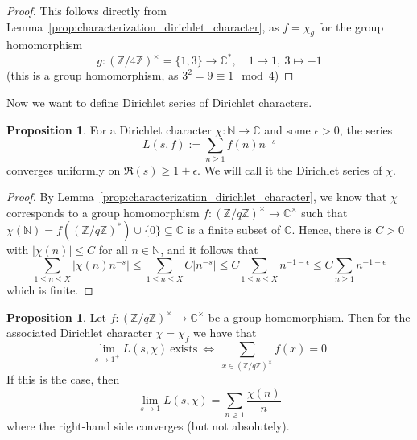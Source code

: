 \documentclass{scrartcl}
\newcommand{\N}{\mathbb{N}}
\newcommand{\Z}{\mathbb{Z}}
\newcommand{\C}{\mathbb{C}}
\newcommand{\units}{\times}
\theoremstyle{definition}
\newtheorem{proposition}[definition]{Proposition}
\begin{document}
\begin{proof}
    This follows directly from Lemma~\ref{prop:characterization_dirichlet_character}, as $f = \chi_g$ for the group homomorphism
    \begin{equation*}
        g: (\Z/4\Z)^\units = \{ 1, 3 \} \to \C^*, \quad 1 \mapsto 1, \ 3 \mapsto -1
    \end{equation*}
    (this is a group homomorphism, as $3^2 = 9 \equiv 1 \mod 4$)
\end{proof}
Now we want to define Dirichlet series of Dirichlet characters.
\begin{proposition}
    For a Dirichlet character $\chi: \N \to \C$ and some $\epsilon > 0$, the series
    \begin{equation*}
        L(s, f) := \sum_{n \geq 1} f(n) n^{-s}
    \end{equation*}
    converges uniformly on $\Re(s) \geq 1 + \epsilon$.
    We will call it the Dirichlet series of $\chi$.
\end{proposition}
\begin{proof}
    By Lemma~\ref{prop:characterization_dirichlet_character}, we know that $\chi$ corresponds to a group homomorphism $f: (\Z/q\Z)^\units \to \C^\units$ such that $\chi(\N) = f((\Z/q\Z)^*) \cup \{ 0 \} \subseteq \C$ is a finite subset of $\C$.
    Hence, there is $C > 0$ with $|\chi(n)| \leq C$ for all $n \in \N$, and it follows that
    \begin{equation*}
        \sum_{1 \leq n \leq X} \left| \chi(n) n^{-s} \right| \leq \sum_{1 \leq n \leq X} C \left| n^{-s} \right| \leq C \sum_{1 \leq n \leq X} n^{-1 - \epsilon} \leq C \sum_{n \geq 1} n^{-1 - \epsilon}
    \end{equation*}
    which is finite.
\end{proof}
\begin{proposition}
    \label{prop:dirichlet_series_at_one}
    Let $f: (\Z/q\Z)^\units \to \C^\units$ be a group homomorphism. Then for the associated Dirichlet character $\chi = \chi_f$ we have that
    \begin{equation*}
        \lim_{s \to 1^+} L(s, \chi) \ \text{exists} \ \Leftrightarrow \ \sum_{x \in (\Z/q\Z)^\units} f(x) = 0
    \end{equation*}
    If this is the case, then
    \begin{equation*}
        \lim_{s \to 1} L(s, \chi) = \sum_{n \geq 1} \frac {\chi(n)} n
    \end{equation*}
    where the right-hand side converges (but not absolutely).
\end{proposition}
\end{document}
